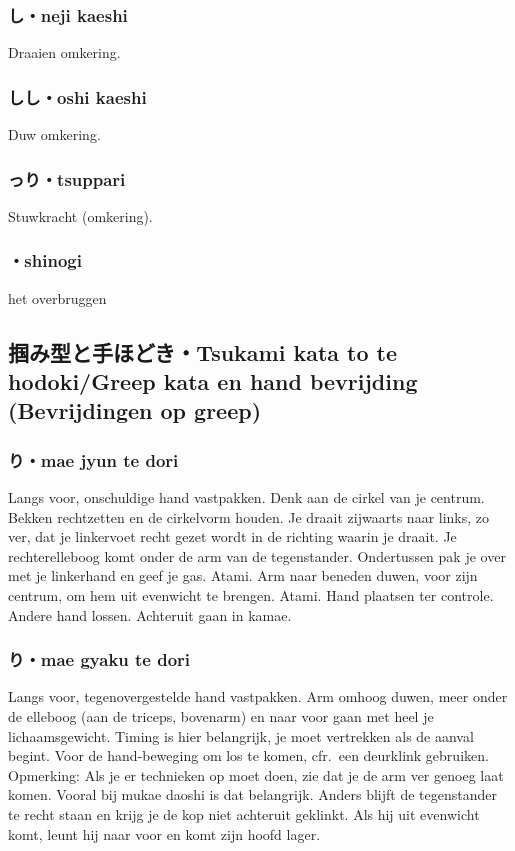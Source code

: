 \subsubsection{し・neji kaeshi}
Draaien omkering.

\subsubsection{しし・oshi kaeshi}
Duw omkering.

\subsubsection{っり・tsuppari}
Stuwkracht (omkering).

\subsubsection{・shinogi}
het overbruggen

\subsection{掴み型と手ほどき・Tsukami kata to te hodoki/Greep kata en hand bevrijding (Bevrijdingen op greep)}
\subsubsection{り・mae jyun te dori}
Langs voor, onschuldige hand vastpakken. Denk aan de cirkel van je centrum. Bekken rechtzetten en de cirkelvorm houden.
Je draait zijwaarts naar links, zo ver, dat je linkervoet recht gezet wordt in de richting waarin je draait. Je rechterelleboog komt onder de arm van de tegenstander. Ondertussen pak je over met je linkerhand en geef je gas. Atami. Arm naar beneden duwen, voor zijn centrum, om hem uit evenwicht te brengen. Atami. Hand plaatsen ter controle. Andere hand lossen. Achteruit gaan in kamae.

\subsubsection{り・mae gyaku te dori}
Langs voor, tegenovergestelde hand vastpakken. Arm omhoog duwen, meer onder de elleboog (aan de triceps, bovenarm) en naar voor gaan met heel je lichaamsgewicht. Timing is hier belangrijk, je moet vertrekken als de aanval begint. Voor de hand-beweging om los te komen, cfr.\ een deurklink gebruiken.\\
\noindent Opmerking: Als je er technieken op moet doen, zie dat je de arm ver genoeg laat komen. Vooral bij mukae daoshi is dat belangrijk. Anders blijft de tegenstander te recht staan en krijg je de kop niet achteruit geklinkt. Als hij uit evenwicht komt, leunt hij naar voor en komt zijn hoofd lager.

